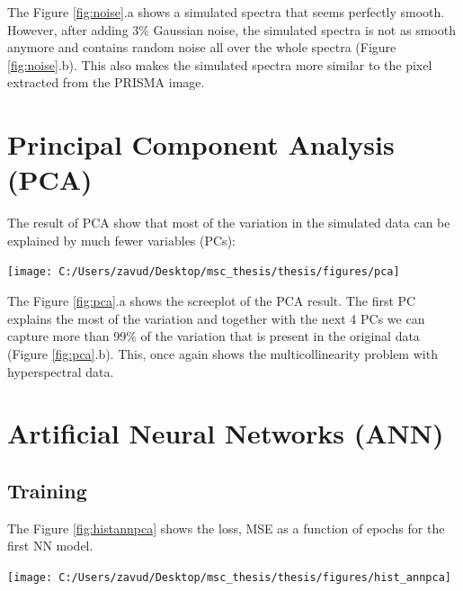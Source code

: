 \documentclass[a4paper, twoside]{templates/ociamthesis}
\let\origfigure\figure
\let\endorigfigure\endfigure
\renewenvironment{figure}[1][2] {
    \expandafter\origfigure\expandafter[H]
} {
    \endorigfigure
}
\begin{document}
The Figure \ref{fig:noise}.a shows a simulated spectra that seems perfectly smooth. However, after adding 3\% Gaussian noise, the simulated spectra is not as smooth anymore and contains random noise all over the whole spectra (Figure \ref{fig:noise}.b). This also makes the simulated spectra more similar to the pixel extracted from the PRISMA image.

\hypertarget{principal-component-analysis-pca-1}{%
\section{Principal Component Analysis (PCA)}\label{principal-component-analysis-pca-1}}

The result of PCA show that most of the variation in the simulated data can be explained by much fewer variables (PCs):

\begin{figure}
\texttt{[image: C:/Users/zavud/Desktop/msc\_thesis/thesis/figures/pca]} \caption{Principal Component Analysis: a) Screeplot, b) Cumulative variance explained by the first 5 PCs}\label{fig:pca}
\end{figure}

The Figure \ref{fig:pca}.a shows the screeplot of the PCA result. The first PC explains the most of the variation and together with the next 4 PCs we can capture more than 99\% of the variation that is present in the original data (Figure \ref{fig:pca}.b). This, once again shows the multicollinearity problem with hyperspectral data.

\newpage

\hypertarget{artificial-neural-networks-ann-1}{%
\section{Artificial Neural Networks (ANN)}\label{artificial-neural-networks-ann-1}}

\hypertarget{training}{%
\subsection{Training}\label{training}}

The Figure \ref{fig:histannpca} shows the loss, MSE as a function of epochs for the first NN model.

\begin{figure}
\texttt{[image: C:/Users/zavud/Desktop/msc\_thesis/thesis/figures/hist\_annpca]} \caption{Training history of ANN with PCs}\label{fig:histannpca}
\end{figure}
\end{document}
